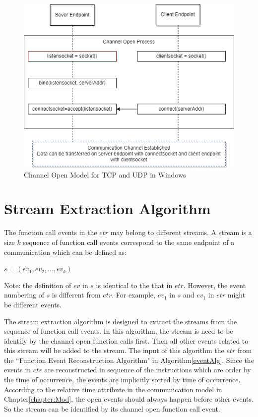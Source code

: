 \begin{figure}[H]
\centerline{\includegraphics[scale=0.45]{Figures/tcpudpchannelopen}}
 \caption{Channel Open Model for TCP and UDP in Windows}
\label{channelopen2}    
\end{figure}

\section{Stream Extraction Algorithm}
The function call events in the $etr$ may belong to different streams. A stream is a size $k$ sequence of function call events correspond to the same endpoint of a communication which can be defined as:

$s = (ev_1, ev_2, ..., ev_k)$

Note: the definition of $ev$ in $s$ is identical to the that in $etr$. However, the event numbering of $s$ is different from $etr$. For example, $ev_1$ in $s$ and $ev_1$ in $etr$ might be different events.

The stream extraction algorithm is designed to extract the streams from the sequence of function call events. In this algorithm, the stream is need to be identify by the channel open function calls first. Then all other events related to this stream will be added to the stream.
The input of this algorithm the $etr$ from the ``Function Event Reconstruction Algorithm" in Algorithm\ref{eventAlg}. Since the events in $etr$ are reconstructed in sequence of the instructions which are order by the time of occurrence, the events are implicitly sorted by time of occurrence. According to the relative time attribute in the communication model in Chapter\ref{chapter:Mod}, the open events should always happen before other events. So the stream can be identified by its channel open function call event. 

